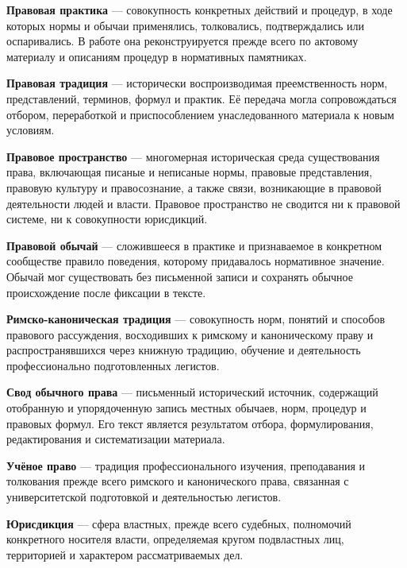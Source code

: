 \noindent\textbf{Правовая практика} --- совокупность конкретных действий и процедур, в ходе которых нормы и обычаи применялись, толковались, подтверждались или оспаривались. В работе она реконструируется прежде всего по актовому материалу и описаниям процедур в нормативных памятниках.
\par\medskip

\noindent\textbf{Правовая традиция} --- исторически воспроизводимая преемственность норм, представлений, терминов, формул и практик. Её передача могла сопровождаться отбором, переработкой и приспособлением унаследованного материала к новым условиям.
\par\medskip

\noindent\textbf{Правовое пространство} --- многомерная историческая среда существования права, включающая писаные и неписаные нормы, правовые представления, правовую культуру и правосознание, а также связи, возникающие в правовой деятельности людей и власти. Правовое пространство не сводится ни к правовой системе, ни к совокупности юрисдикций.
\par\medskip

\noindent\textbf{Правовой обычай} --- сложившееся в практике и признаваемое в конкретном сообществе правило поведения, которому придавалось нормативное значение. Обычай мог существовать без письменной записи и сохранять обычное происхождение после фиксации в тексте.
\par\medskip

\noindent\textbf{Римско-каноническая традиция} --- совокупность норм, понятий и способов правового рассуждения, восходивших к римскому и каноническому праву и распространявшихся через книжную традицию, обучение и деятельность профессионально подготовленных легистов.
\par\medskip

\noindent\textbf{Свод обычного права} --- письменный исторический источник, содержащий отобранную и упорядоченную запись местных обычаев, норм, процедур и правовых формул. Его текст является результатом отбора, формулирования, редактирования и систематизации материала.
\par\medskip

\noindent\textbf{Учёное право} --- традиция профессионального изучения, преподавания и толкования прежде всего римского и канонического права, связанная с университетской подготовкой и деятельностью легистов.
\par\medskip

\noindent\textbf{Юрисдикция} --- сфера властных, прежде всего судебных, полномочий конкретного носителя власти, определяемая кругом подвластных лиц, территорией и характером рассматриваемых дел.
\par\medskip

